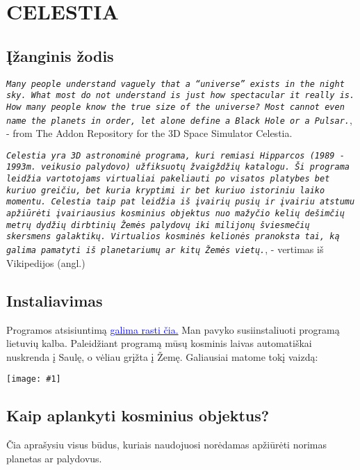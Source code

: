 \documentclass[a4paper]{article}
\newcommand{\incl}[2]{\texttt{[image: \#1]}}
\newcommand{\goto}[2]{\href{\detokenize{#1}}{\textcolor{blue}{#2}}}
\begin{document}
\section*{CELESTIA}
\subsection*{Įžanginis žodis}
\texttt{\textit{Many people understand vaguely that a “universe” exists in the night sky.  What most do not understand is just how spectacular it really is.  How many people know the true size of the universe?  Most cannot even name the planets in order, let alone define a Black Hole or a Pulsar.}}, - from The Addon Repository for the 3D Space Simulator Celestia.

\texttt{\textit{Celestia yra 3D astronominė programa, kuri remiasi Hipparcos (1989 - 1993m. veikusio palydovo) užfiksuotų žvaigždžių katalogu. Ši programa leidžia vartotojams virtualiai pakeliauti po visatos platybes bet kuriuo greičiu, bet kuria kryptimi ir bet kuriuo istoriniu laiko momentu. \textit{Celestia} taip pat leidžia iš įvairių pusių ir įvairiu atstumu apžiūrėti įvairiausius kosminius objektus nuo mažyčio kelių dešimčių metrų dydžių dirbtinių Žemės palydovų iki milijonų šviesmečių skersmens galaktikų. Virtualios kosminės kelionės pranoksta tai, ką galima pamatyti iš planetariumų ar kitų Žemės vietų.}}, - vertimas iš Vikipedijos (angl.)

\subsection*{Instaliavimas}

Programos atsisiuntimą \goto{https://celestia.space/download.html}{galima rasti čia.} Man pavyko susiinstaliuoti programą lietuvių kalba. Paleidžiant programą mūsų kosminis laivas automatiškai nuskrenda į Saulę, o vėliau grįžta į Žemę. Galiausiai matome tokį vaizdą:

\begin{center}
\incl{main.jpg}{0.5}
\end{center}

\subsection*{Kaip aplankyti kosminius objektus?}
Čia aprašysiu visus būdus, kuriais naudojuosi norėdamas apžiūrėti norimas planetas ar palydovus. 
\end{document}
